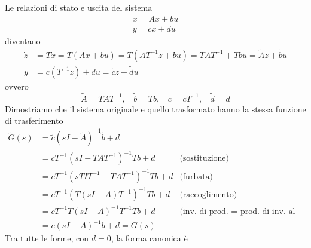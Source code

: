 Le relazioni di stato e uscita del sistema
\begin{gather*}
	\dot{x} =Ax+bu\\
	y=cx+du
\end{gather*}
diventano
\begin{equation*}
	\begin{aligned}
		\dot{z} & =T\dot{x} =T\left(Ax+bu\right) =T\left(AT^{-1} z+bu\right) =TAT^{-1} +Tbu=\tilde{A} z+\tilde{b} u \\
		y       & =c\left(T^{-1} z\right) +du=\tilde{c} z+\tilde{d} u                                                
	\end{aligned}
\end{equation*}
ovvero
\begin{equation*}
	\boxed{\tilde{A} =TAT^{-1} ,\ \ \ \ \tilde{b} =Tb,\ \ \ \ \tilde{c} =cT^{-1} ,\ \ \ \ \tilde{d} =d}
\end{equation*}
Dimostriamo che il sistema originale e quello trasformato hanno la stessa funzione di trasferimento
\begin{equation*}
	\begin{aligned}
		\tilde{G}(s) & =\tilde{c}\left(sI-\tilde{A}\right)^{-1}\tilde{b} +\tilde{d} &                                                  \\
		             & =cT^{-1}\left(sI-TAT^{-1}\right)^{-1} Tb+d                   & \text{(sostituzione)}                            \\
		             & =cT^{-1}\left(s T I T^{-1} -TAT^{-1}\right)^{-1} Tb+d        & \text{(furbata)}                                 \\
		             & =cT^{-1}\left(T(sI-A) T^{-1}\right)^{-1} Tb+d               & \text{(raccoglimento)}                           \\
		             & =cT^{-1} T(sI-A)^{-1} T^{-1} Tb+d                            & \text{(inv. di prod. = prod. di inv. al contr.)} \\
		             & =c(sI-A)^{-1} b+d=G(s)                                       &                                                  
	\end{aligned}
\end{equation*}
Tra tutte le forme, con $d=0$, la forma canonica è
